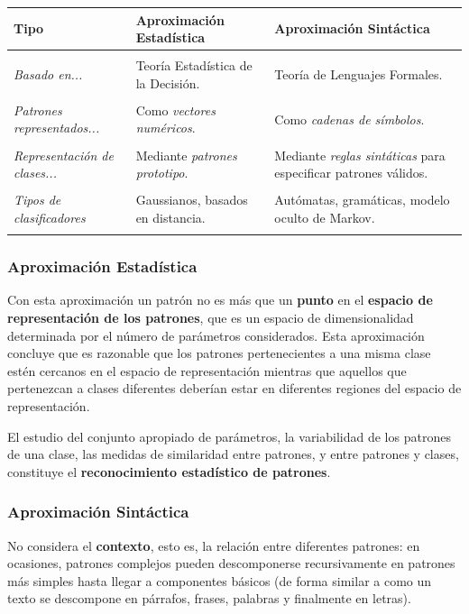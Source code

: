 \documentclass[10pt,a4paper]{article}
\begin{document}
\begin{tabular}{l p{5.3cm} p{5.3cm}}
{\bf Tipo} &
{\bf Aproximación Estadística} & 
{\bf Aproximación Sintáctica} \\\hline \\ [-1.5ex]
\textit{Basado en...} &
Teoría Estadística de la Decisión. &
Teoría de Lenguajes Formales.
\\ [1ex] \hline \\ [-1.5ex]
%
\textit{Patrones representados...} &
Como \textit{vectores numéricos}.  &
Como \textit{cadenas de símbolos}.
\\ [1ex] \hline \\ [-1.5ex]
%
\textit{Representación de clases...} &
Mediante \textit{patrones prototipo}.  &
Mediante \textit{reglas sintáticas} para especificar patrones válidos.
\\ [1ex] \hline \\ [-1.5ex]
%
\textit{Tipos de clasificadores} &
Gaussianos, basados en distancia.  &
Autómatas, gramáticas, modelo oculto de Markov.
\\ [1ex] \hline \\ [-1.5ex]
\end{tabular}

\subsubsection{Aproximación Estadística}

Con esta aproximación un patrón no es más que un \textbf{punto} en el \textbf{espacio de representación de los patrones}, que es un espacio de dimensionalidad determinada por el número de parámetros considerados. Esta aproximación concluye que es razonable que los patrones pertenecientes a una misma clase estén cercanos en el espacio de representación mientras que aquellos que pertenezcan a clases diferentes deberían estar en diferentes regiones del espacio de representación. 

El estudio del conjunto apropiado de parámetros, la variabilidad de los patrones de una clase, las medidas de similaridad entre patrones, y entre patrones y clases, constituye el \textbf{reconocimiento estadístico de patrones}.

\subsubsection{Aproximación Sintáctica}

No considera el \textbf{contexto}, esto es, la relación entre diferentes patrones: en ocasiones, patrones complejos pueden descomponerse recursivamente en patrones más simples hasta llegar a componentes básicos (de forma similar a como un texto se descompone en párrafos, frases, palabras y finalmente en letras). 
\end{document}

